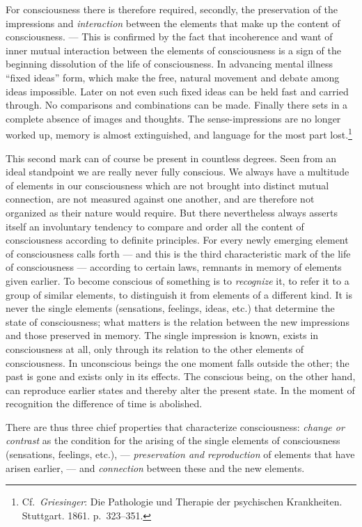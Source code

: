 \documentclass[12pt,a4paper]{book}
\newcommand{\opage}[1]{\marginnote{\footnotesize\textit{[#1]}}}
\begin{document}
For consciousness there is therefore required, secondly, the
preservation of the impressions and \emph{interaction} between the
elements that make up the content of consciousness. --- This is
confirmed by the fact that incoherence and want of inner mutual
interaction between the elements of consciousness is a sign of the
beginning dissolution of the life of consciousness. In advancing mental
illness ``fixed ideas'' form, which make the free, natural movement and
debate among ideas impossible. Later on not even such fixed ideas can be
held fast and carried through. No comparisons and combinations can be
made. Finally there sets in a complete absence of images and thoughts.
The sense-impressions are no longer worked up, memory is almost
extinguished, and language for the most part
lost.\footnote{Cf.\ \emph{Griesinger}: Die Pathologie und Therapie der
psychischen Krankheiten. Stuttgart. 1861. p.~323--351.}

This second mark can of course be present in countless degrees. Seen
from an ideal standpoint we are really never fully conscious. We always
have a multitude of elements in our consciousness which are not brought
into distinct mutual connection, are not measured against one another,
and are therefore not organized as their nature would require. But there
nevertheless always asserts itself an involuntary tendency to compare
and order all the content of consciousness according to definite
principles. For every
\opage{57}newly emerging element of consciousness calls forth --- and
this is the third characteristic mark of the life of consciousness ---
according to certain laws, remnants in memory of elements given earlier.
To become conscious of something is to \emph{recognize} it, to refer it
to a group of similar elements, to distinguish it from elements of a
different kind. It is never the single elements (sensations, feelings,
ideas, etc.) that determine the state of consciousness; what matters is
the relation between the new impressions and those preserved in memory.
The single impression is known, exists in consciousness at all, only
through its relation to the other elements of consciousness. In
unconscious beings the one moment falls outside the other; the past is
gone and exists only in its effects. The conscious being, on the other
hand, can reproduce earlier states and thereby alter the present state.
In the moment of recognition the difference of time is abolished.

There are thus three chief properties that characterize consciousness:
\emph{change or contrast} as the condition for the arising of the single
elements of consciousness (sensations, feelings, etc.), ---
\emph{preservation and reproduction} of elements that have arisen
earlier, --- and \emph{connection} between these and the new elements.
\end{document}

